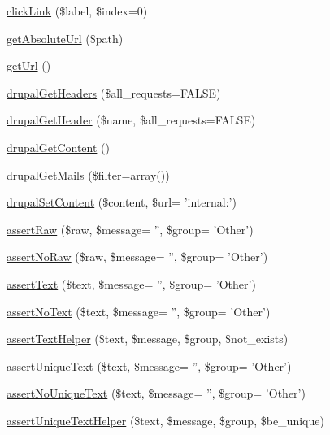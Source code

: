\begin{DoxyCompactItemize}
\item 
\hyperlink{class_drupal_web_test_case_a716c6eef22f216695376ea5b531ce9a1}{clickLink} (\$label, \$index=0)
\item 
\hyperlink{class_drupal_web_test_case_ab170c2353296a22d88f4c7da58418d57}{getAbsoluteUrl} (\$path)
\item 
\hyperlink{class_drupal_web_test_case_a71fa7ff2a1b0b76829605458e875c9a0}{getUrl} ()
\item 
\hyperlink{class_drupal_web_test_case_a9bbd6c61b69af17eeb79d59b1632a691}{drupalGetHeaders} (\$all\_\-requests=FALSE)
\item 
\hyperlink{class_drupal_web_test_case_a2a5d661d1f61cf9ac2c8bb5969d5d373}{drupalGetHeader} (\$name, \$all\_\-requests=FALSE)
\item 
\hyperlink{class_drupal_web_test_case_a65cc4334da96452d127a9fb50636e7bb}{drupalGetContent} ()
\item 
\hyperlink{class_drupal_web_test_case_af2c147ab7789a251a27aa88a70282432}{drupalGetMails} (\$filter=array())
\item 
\hyperlink{class_drupal_web_test_case_a75c4e29bdb78951d61993b13985bad1c}{drupalSetContent} (\$content, \$url= 'internal:')
\item 
\hyperlink{class_drupal_web_test_case_ae15c8d3302ff90dc47d2fd7686ee4005}{assertRaw} (\$raw, \$message= '', \$group= 'Other')
\item 
\hyperlink{class_drupal_web_test_case_ae683aebc33c05b0ba2e7e3f06f4485a9}{assertNoRaw} (\$raw, \$message= '', \$group= 'Other')
\item 
\hyperlink{class_drupal_web_test_case_ad721f3f08df154f1ccaf7b8ab0d2d9d0}{assertText} (\$text, \$message= '', \$group= 'Other')
\item 
\hyperlink{class_drupal_web_test_case_aa2d5a43e1615b89589b7c8b2a2e4f487}{assertNoText} (\$text, \$message= '', \$group= 'Other')
\item 
\hyperlink{class_drupal_web_test_case_a870c322ff86add51471f4b39905111d7}{assertTextHelper} (\$text, \$message, \$group, \$not\_\-exists)
\item 
\hyperlink{class_drupal_web_test_case_aa8d65b2749e7d0430b07bd77f7f4877b}{assertUniqueText} (\$text, \$message= '', \$group= 'Other')
\item 
\hyperlink{class_drupal_web_test_case_a058c82a867e22a61b68891a009294e7b}{assertNoUniqueText} (\$text, \$message= '', \$group= 'Other')
\item 
\hyperlink{class_drupal_web_test_case_aa853442f9c99a2205c56db88065b58b5}{assertUniqueTextHelper} (\$text, \$message, \$group, \$be\_\-unique)

\end{DoxyCompactItemize}
